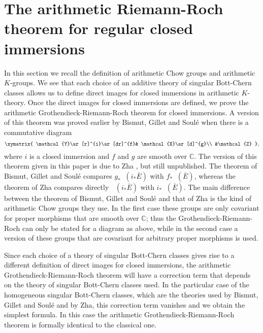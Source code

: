 \documentclass[10pt,twoside]{article}
\numberwithin{equation}{section}
\theoremstyle{plain}
\theoremstyle{definition}
\DeclareMathOperator{\chh}{\widehat{ch}}
\begin{document}
\section{The arithmetic Riemann-Roch theorem for regular closed  
  immersions} 


In this section we recall the definition of arithmetic Chow groups and
arithmetic $K$-groups. We see that each choice of an additive theory
of singular 
Bott-Chern classes allows us to define direct images for closed
immersions in arithmetic
$K$-theory. Once the direct images for closed immersions are defined,
we prove the arithmetic Grothendieck-Riemann-Roch theorem for closed
immersions. A
version of this theorem was proved earlier by Bismut, Gillet and
Soul\'e 
\cite{BismutGilletSoule:MR1086887} when there is a commutative diagram 
\begin{displaymath}
  \xymatrix{
    \mathcal{Y}\ar[r]^{i}\ar[dr]^{f}& \mathcal{X}\ar[d]^{g}\\
    &\mathcal{Z}
  },
\end{displaymath}
where $i$ is a closed immersion and $f$ and $g$ are
smooth  over $\mathbb{C}$.
The version of this theorem given in this paper is due to Zha
\cite{zha99:_rieman_roch}, but still unpublished. 
 The theorem of Bismut, Gillet and Soul\'e
compares $g_{\ast}\chh(i_{\ast}\overline E)$ with
$f_{\ast}\chh(\overline E)$, whereas the theorem of Zha compares
directly $\chh(i_{\ast}\overline E)$ with $i_{\ast}\chh(\overline
E)$. The main difference between the theorem of Bismut, Gillet and 
Soul\'e and that of Zha is the kind of arithmetic Chow groups they
use. In 
the first 
case these groups are only covariant for proper
morphisms that are smooth over $\mathbb{C}$; thus the
Grothendieck-Riemann-Roch can only be stated for a diagram as above,
while in the second case a version of these groups that are covariant
for arbitrary proper morphisms is used. 


Since each choice of a theory of singular Bott-Chern classes gives
rise to a 
different definition of direct images for closed immersions, the
arithmetic Grothendieck-Riemann-Roch theorem will have a correction
term that 
depends on the theory of singular Bott-Chern classes used. In the
particular case of the homogeneous singular Bott-Chern classes, which
are the theories used by  Bismut, Gillet and Soul\'e and by Zha, this
correction term vanishes and we obtain the simplest formula. In this
case the arithmetic Grothendieck-Riemann-Roch theorem is formally
identical to the classical one.
\end{document}
